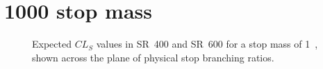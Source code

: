 \FloatBarrier

\newpage
\section{1000 \texorpdfstring{\GeV}{GeV} stop mass}

\begin{figure}[ht]
  \centering
  \caption{
    Expected $CL_S$ values in SR~400 and SR~600 for a stop mass of 1~\TeV,
    shown across the plane of physical stop branching ratios.
  }
\end{figure}

